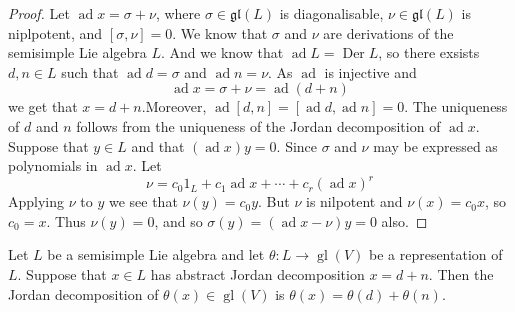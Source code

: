 \documentclass[../main.tex]{subfiles}
\begin{document}
\begin{proof}
    Let \(  \operatorname{ad}x=  \sigma + \nu   \), where \(   \sigma \in \mathfrak{gl}\left( L \right)   \) is diagonalisable, \(  \nu \in \mathfrak{gl}\left( L \right)   \) is niplpotent, and \(  \left[  \sigma ,\nu  \right]= 0   \). We know that \(   \sigma   \) and \(  \nu   \) are derivations of the semisimple Lie algebra \(  L  \).  And we know that \(  \operatorname{ad}L= \operatorname{Der}L  \), so there exsists   \(  d, n \in L  \) such that \(  \operatorname{ad}d=  \sigma   \) and \(  \operatorname{ad}n = \nu   \). As \(  \operatorname{ad}  \) is injective and \[
    \operatorname{ad}x=  \sigma + \nu = \operatorname{ad}\left( d+ n \right) 
    \] we get that \(  x= d+ n  \).Moreover, \(  \operatorname{ad}\left[ d,n \right]= \left[ \operatorname{ad}d,\operatorname{ad}n \right]= 0    \). The uniqueness of \(  d  \) and \(  n  \) follows from the uniqueness of the Jordan decomposition of \(  \operatorname{ad}x  \). Suppose that \(  y\in L  \) and that \(  \left( \operatorname{ad}x \right)y= 0   \). Since \(   \sigma   \) and \(  \nu   \)              may be expressed as polynomials in \(  \operatorname{ad}x  \). Let \[
    \nu = c_0 1_{L}+ c_1 \operatorname{ad}x+ \cdots + c_{r}\left( \operatorname{ad}x \right)^{r} 
    \] Applying \(  \nu   \) to \(  y  \) we see that \(  \nu \left( y \right)= c_0y   \). But \(  \nu   \) is nilpotent and \(  \nu \left( x \right)= c_0x   \), so \(  c_0= x  \). Thus \(  \nu \left( y \right)= 0   \), and so \(   \sigma \left( y \right)= \left( \operatorname{ad}x-\nu  \right)y= 0    \) also.             
\end{proof}

\begin{definition}{}{}
    Let $L$ be a semisimple Lie algebra and let $\theta: L \to \operatorname{gl}(V)$ be a representation of $L$. Suppose that $x \in L$ has abstract Jordan decomposition $x = d+n$. Then the Jordan decomposition of $\theta(x) \in \operatorname{gl}(V)$ is $\theta(x) = \theta(d) + \theta(n)$.
\end{definition}
\end{document}
